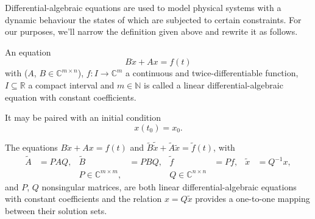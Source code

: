 Differential-algebraic equations are used to model physical systems with a dynamic behaviour the states of which are
subjected to certain constraints. For our purposes, we'll narrow the definition given above and rewrite it as follows.
\begin{definition}
    An equation
    \[
        B \dot{x} + Ax = f(t)
    \]
    with (\(A\), \(B \in \mathbb{C}^{m \times n}\)),
    \(f: I \rightarrow \mathbb{C}^m\) a continuous and twice-differentiable function, \(I \subseteq \mathbb{R}\) a
    compact interval and \(m \in \mathbb{N}\) is called a linear differential-algebraic equation with constant
    coefficients.

    It may be paired with an initial condition
    \[
        x(t_{0}) = x_{0}.
    \]
\end{definition}

\begin{remark}
    The equations \(B \dot{x} + Ax = f(t)\) and \(\tilde{B} \tilde{\dot{x}} + \tilde{A}\tilde{x} = \tilde{f}(t)\), with
    \begin{align*}
        \tilde{A} &= PAQ, & \tilde{B} &= PBQ, & \tilde{f} &= Pf, & \tilde{x} &= Q^{-1}x, \\
        && P \in \mathbb{C}^{m \times m}, && Q \in \mathbb{C}^{n \times n}
    \end{align*}
    and \(P\), \(Q\) nonsingular matrices, are both linear differential-algebraic equations with constant coefficients and
    the relation \(x = Q\tilde{x}\) provides a one-to-one mapping between their solution sets.
\end{remark}

